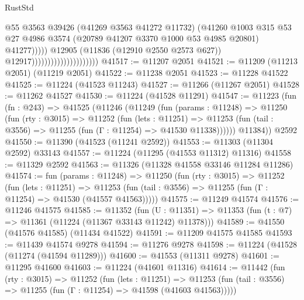 \begin{lexlean}{RustStd}
\begin{coremodule}
                                                      @55
                                                      @3563
                                                      @39426
                                                      (@41269 @3563 @41272 @11732)
                                                      (@41260
                                                        @1003
                                                        @315
                                                        @53
                                                        @27
                                                        @4986
                                                        @3574
                                                        (@20789 @41207 @3370 @1000 @53 @4985 @20801)
                                                        @41277)))))
                                              @12905
                                              (@11836 (@12910 @2550 @2573 @627))
                                              @12917)))))))))))))))))))))
@41517 := @11207 @2051
@41521 := @11209 (@11213 @2051) (@11219 @2051)
@41522 := @11238 @2051
@41523 := @11228 @41522
@41525 := @11224 (@41523 @11243)
@41527 := @11266 (@11267 @2051)
@41528 := @11262 @41527
@41530 := @11224 (@41528 @11291)
@41547 := @11223
    (fun (fn : @243) =>
    @41525
      (@11246
        (@11249
          (fun (params : @11248) =>
          @11250
            (fun (rty : @3015) =>
            @11252
              (fun (lets : @11251) =>
              @11253 (fun (tail : @3556) => @11255 (fun (Γ : @11254) => @41530 @11338))))))
        @11384))
    @2592
@41550 := @11390 (@41523 (@11241 @2592))
@41553 := @11303 (@11304 @2592) @33143
@41557 := @11224 (@11295 (@41553 @11312) @11316)
@41558 := @11329 @2592
@41563 := @11326 (@11328 @41558 @33146 @11284 @11286)
@41574 := fun (params : @11248) =>
  @11250
    (fun (rty : @3015) =>
    @11252
      (fun (lets : @11251) =>
      @11253 (fun (tail : @3556) => @11255 (fun (Γ : @11254) => @41530 (@41557 @41563)))))
@41575 := @11249 @41574
@41576 := @11246 @41575
@41585 := @11352
    (fun (U : @11351) => @11353 (fun (t : @7) => @11361 (@11224 (@11367 @33143 @11242) @11378)))
@41589 := @41550 (@41576 @41585) (@11434 @41522)
@41591 := @11209 @41575 @41585
@41593 := @11439 @41574 @9278
@41594 := @11276 @9278
@41598 := @11224 (@41528 (@11274 (@41594 @11289)))
@41600 := @41553 (@11311 @9278)
@41601 := @11295 @41600
@41603 := @11224 (@41601 @11316)
@41614 := @11442
    (fun (rty : @3015) =>
    @11252
      (fun (lets : @11251) =>
      @11253 (fun (tail : @3556) => @11255 (fun (Γ : @11254) => @41598 (@41603 @41563)))))

\end{coremodule}
\end{lexlean}
